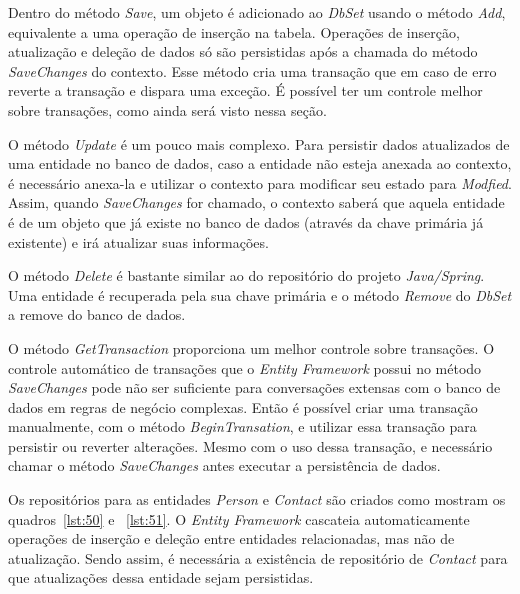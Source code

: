 \documentclass[a4paper,12pt]{article}
\newcommand{\est}[1] {
\textit{#1}}
\newcommand{\classe}[1] {
\textit{#1}}
\newcommand{\metodo}[1] {
\textit{#1}}
\newcommand{\sharpcode}[3] {
	
}
\begin{document}
Dentro do método \metodo{Save}, um objeto é adicionado ao \classe{DbSet} usando o método \metodo{Add}, equivalente a uma operação de inserção na tabela. Operações de inserção, atualização e deleção de dados só são persistidas após a chamada do método \metodo{SaveChanges} do contexto. Esse método cria uma transação que em caso de erro reverte a transação e dispara uma exceção. É possível ter um controle melhor sobre transações, como ainda será visto nessa seção.

O método \metodo{Update} é um pouco mais complexo. Para persistir dados atualizados de uma entidade no banco de dados, caso a entidade não esteja anexada ao contexto, é necessário anexa-la e utilizar o contexto para modificar seu estado para \classe{Modfied}. Assim, quando \metodo{SaveChanges} for chamado, o contexto saberá que aquela entidade é de um objeto que já existe no banco de dados (através da chave primária já existente) e irá atualizar suas informações.

O método \metodo{Delete} é bastante similar ao do repositório do projeto \est{Java/Spring}. Uma entidade é recuperada pela sua chave primária e o método \metodo{Remove} do \classe{DbSet} a remove do banco de dados.

O método \metodo{GetTransaction} proporciona um melhor controle sobre transações. O controle automático de transações que o \est{Entity Framework} possui no método \metodo{SaveChanges} pode não ser suficiente para conversações extensas com o banco de dados em regras de negócio complexas. Então é possível criar uma transação manualmente, com o método \metodo{BeginTransation}, e utilizar essa transação para persistir ou reverter alterações. Mesmo com o uso dessa transação, e necessário chamar o método \metodo{SaveChanges} antes executar a persistência de dados.

Os repositórios para as entidades \classe{Person} e \classe{Contact} são criados como mostram os quadros~\ref{lst:50} e ~\ref{lst:51}. O \est{Entity Framework} cascateia automaticamente operações de inserção e deleção entre entidades relacionadas, mas não de atualização. Sendo assim, é necessária a existência de repositório de \classe{Contact} para que atualizações dessa entidade sejam persistidas.

\sharpcode{code/50.txt}{\est{Interfaces} \classe{IPersonRepository} e \classe{IContactRepository}}{lst:50}

\sharpcode{code/51.txt}{Classes \classe{PersonRepository} e \classe{ContactRepository}}{lst:51}
\end{document}
